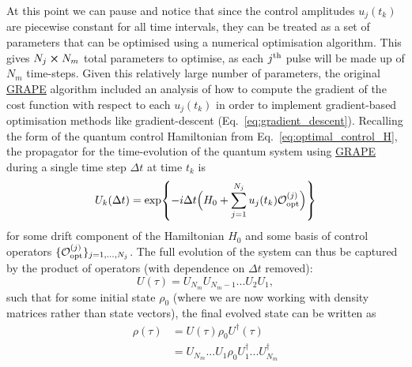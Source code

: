 \documentclass[a4paper,oneside,11pt]{book}
\newcommand{\adj}[1]{#1^{\dagger}}
\newcommand{\acrref}[1]{\hyperref[acr:#1]{#1}}
\begin{document}
At this point we can pause and notice that since the control amplitudes $u_j(t_k)$ are piecewise constant for all time intervals, they can be treated as a set of parameters that can be optimised using a numerical optimisation algorithm. This gives $N_j \cross N_m$ total parameters to optimise, as each $j^{\rm th}$ pulse will be made up of $N_m$ time-steps. Given this relatively large number of parameters, the original \acrref{GRAPE} algorithm included an analysis of how to compute the gradient of the cost function with respect to each $u_j(t_k)$ in order to implement gradient-based optimisation methods like gradient-descent (Eq.~\eqref{eq:gradient_descent}). Recalling the form of the quantum control Hamiltonian from Eq.~\eqref{eq:optimal_control_H}, the propagator for the time-evolution of the quantum system using \acrref{GRAPE} during a single time step $\Delta t$ at time $t_k$ is
\begin{equation}
    U_k(\Delta t) = \exp{- i \Delta t \Big( H_0 + \sum_{j=1}^{N_j} u_j(t_k) \mathcal{O}_{\rm opt}^{(j)} \Big)}
\end{equation}
for some drift component of the Hamiltonian $H_0$ and some basis of control operators $\{\mathcal{O}_{\rm opt}^{(j)}\}_{j = 1,...,N_j}$. The full evolution of the system can thus be captured by the product of operators (with dependence on $\Delta t$ removed):
\begin{equation}
    U(\tau) = U_{N_m} U_{N_m - 1} ... U_{2} U_{1},
\end{equation}
such that for some initial state $\rho_0$ (where we are now working with density matrices rather than state vectors), the final evolved state can be written as
\begin{equation}\label{eq:grape_rho_evolved}
    \begin{aligned}
        \rho(\tau) &= U(\tau)\rho_0 \adj{U}(\tau) \\
        &= U_{N_m} ... U_{1} \rho_0 \adj{U}_{1} ... \adj{U}_{N_m}
    \end{aligned}
\end{equation}
\end{document}
